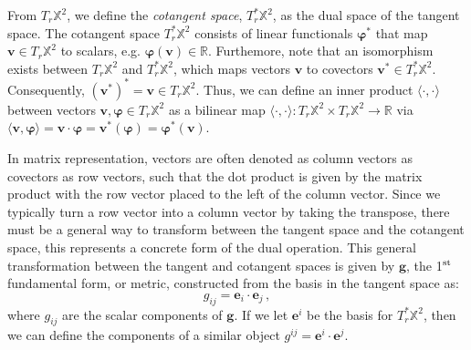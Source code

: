 \begin{appendices}
From $T_r\mathbb{X}^2$, we define the \emph{cotangent space}, $T^*_r\mathbb{X}^2$, as the dual space of the tangent space.
The cotangent space $T^*_r\mathbb{X}^2$ consists of linear functionals $\bm{\varphi}^*$ that map $\mathbf{v} \in T_r\mathbb{X}^2$ to scalars, e.g. $\bm{\varphi}(\mathbf{v}) \in \mathbb{R}$.
Furthemore, note that an isomorphism exists between $T_r\mathbb{X}^2$ and $T^*_r\mathbb{X}^2$, which maps vectors $\mathbf{v}$ to covectors $\mathbf{v}^* \in T^*_r\mathbb{X}^2$.
Consequently, $(\mathbf{v}^*)^* = \mathbf{v} \in T_r\mathbb{X}^2$.
Thus, we can define an inner product $\langle \cdot, \cdot \rangle$ between vectors $\mathbf{v},\bm{\varphi} \in T_r\mathbb{X}^2$ as a bilinear map
 $\langle \cdot, \cdot \rangle : T_r\mathbb{X}^2 \times T_r\mathbb{X}^2 \rightarrow \mathbb{R}$
 via $\langle \mathbf{v}, \bm{\varphi} \rangle = \mathbf{v} \cdot \bm{\varphi} = \mathbf{v}^*(\bm{\varphi}) = \bm{\varphi}^*(\mathbf{v}) $.

In matrix representation, vectors are often denoted as column vectors as covectors as row vectors, such that the dot product is given by the matrix product with the row vector placed to the left of the column vector.
Since we typically turn a row vector into a column vector by taking the transpose, there must be a general way to transform between the tangent space and the cotangent space, this represents a concrete form of the dual operation.
This general transformation between the tangent and cotangent spaces is given by $\mathbf{g}$, the 1$^{\rm st}$ fundamental form, or metric, constructed from the basis in the tangent space as:
\begin{equation}
  g_{ij} = \mathbf{e}_i \cdot \mathbf{e}_j\, ,\label{e:A-metric}
\end{equation}
where $g_{ij}$ are the scalar components of $\mathbf{g}$.
If we let $\mathbf{e}^i$ be the basis for $T^*_r\mathbb{X}^{2}$, then we can define the components of a similar object $g^{ij} = \mathbf{e}^i \cdot \mathbf{e}^j$. \\


\end{appendices}
